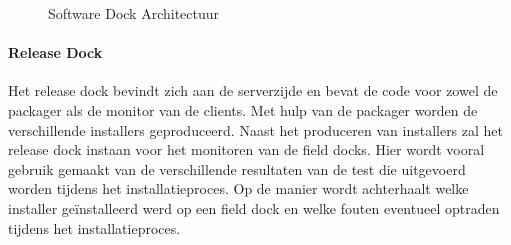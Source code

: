 \begin{figure}[!ht]
\centering
{}
\caption{Software Dock Architectuur \citep{hall1999cooperative}}
\label{fig:softwareDockAangepast}
\end{figure}

\paragraph{Release Dock}
Het release dock bevindt zich aan de serverzijde en bevat de code voor zowel de packager als de monitor van de clients.
Met hulp van de packager worden de verschillende installers geproduceerd.
Naast het produceren van installers zal het release dock instaan voor het monitoren van de field docks.
Hier wordt vooral gebruik gemaakt van de verschillende resultaten van de test die uitgevoerd worden tijdens het installatieproces.
Op de manier wordt achterhaalt welke installer geïnstalleerd werd op een field dock en welke fouten eventueel optraden tijdens het installatieproces.

